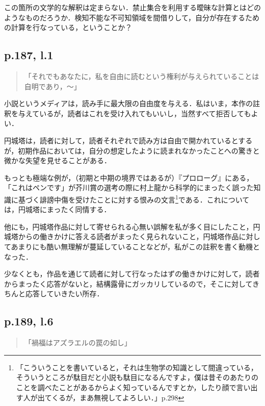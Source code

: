 \documentclass[10pt, a5paper, twoside]{ltjsarticle}
\begin{document}
            この箇所の文学的な解釈は定まらない．禁止集合を利用する曖昧な計算とはどのようなものだろうか．検知不能な不可知領域を間借りして，自分が存在するための計算を行なっている，ということか？

        \subsection{p.187, l.1}

            \begin{quote}
                「それでもあなたに，私を自由に読むという権利が与えられていることは自明であり，〜」
            \end{quote}

            小説というメディアは，読み手に最大限の自由度を与える．私はいま，本作の註釈を与えているが，読者はこれを受け入れてもいいし，当然すべて拒否してもよい．

            円城塔は，読者に対して，読者それぞれで読み方は自由で開かれているとするが，初期作品においては，自分の想定したように読まれなかったことへの驚きと微かな失望を見せることがある．

            もっとも極端な例が，（初期と中期の境界ではあるが）『プロローグ』にある，「これはペンです」が芥川賞の選考の際に村上龍から科学的にまったく誤った知識に基づく誹謗中傷を受けたことに対する恨みの文言\footnote{「こういうことを書いていると，それは生物学の知識として間違っている，そういうところが駄目だと小説も駄目になるんですよ，僕は昔そのあたりのことを調べたことがあるからよく知っているんですとか，したり顔で言い出す人が出てくるが，まあ無視してよろしい．」\cite{prologue}p.298}である．これについては，円城塔にまったく同情する．

            他にも，円城塔作品に対して寄せられる心無い誤解を私が多く目にしたこと，円城塔からの働きかけに答える読者がまったく見られないこと，円城塔作品に対してあまりにも酷い無理解が蔓延していることなどが，私がこの註釈を書く動機となった．

            少なくとも，作品を通じて読者に対して行なったはずの働きかけに対して，読者からまったく応答がないと，結構露骨にガッカリしているので，そこに対してきちんと応答していきたい所存．

        \subsection{p.189, l.6}

            \begin{quote}
                「禍福はアズラエルの罠の如し」
            \end{quote}
\end{document}
